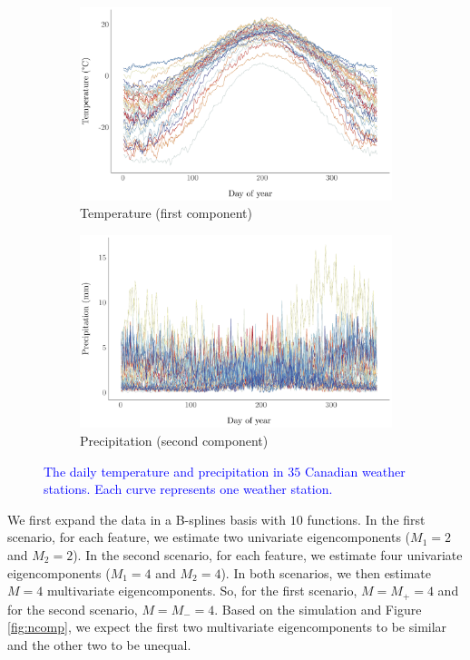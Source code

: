 \begin{figure}[!h]
     \centering
     \begin{subfigure}[b]{0.49\textwidth}
         \centering
         \includegraphics[width=1\textwidth]{figures/temperature.pdf}
         \caption{Temperature (first component)}
         \label{fig:temperature}
     \end{subfigure}
     \hfill
     \begin{subfigure}[b]{0.49\textwidth}
         \centering
         \includegraphics[width=1\textwidth]{figures/precipitation.pdf}
         \caption{Precipitation (second component)}
         \label{fig:precipitation}
     \end{subfigure}
     \caption{\textcolor{blue}{The daily temperature and precipitation in $35$ Canadian weather stations. Each curve represents one weather station.}}
     \label{fig:weather}
\end{figure}

We first expand the data in a B-splines basis with $10$ functions. In the first scenario, for each feature, we estimate two univariate eigencomponents ($M_1 = 2$ and $M_2 = 2$). In the second scenario, for each feature, we estimate four univariate eigencomponents ($M_1 = 4$ and $M_2 = 4$). In both scenarios, we then estimate $M = 4$ multivariate eigencomponents. So, for the first scenario, $M = M_{+} = 4$ and for the second scenario, $M = M_{-} = 4$. Based on the simulation and Figure \ref{fig:ncomp}, we expect the first two multivariate eigencomponents to be similar and the other two to be unequal.

